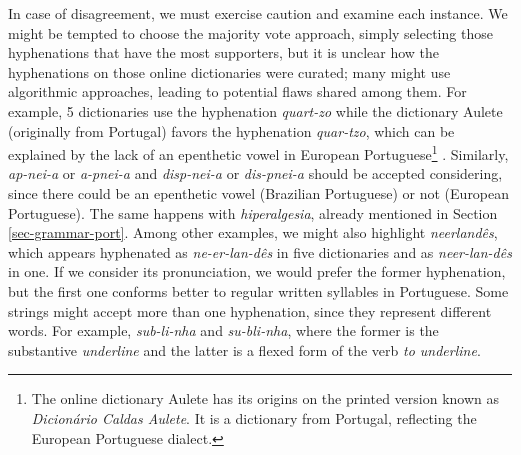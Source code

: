In case of disagreement, we must exercise caution and examine each instance.
We might be tempted to choose the majority vote approach, simply selecting
those hyphenations that have the most supporters, but it is unclear 
how the hyphenations on those online dictionaries were curated; 
many might use algorithmic approaches, leading to potential flaws shared
among them. 
For example, 5 dictionaries use the hyphenation 
\emph{quart-zo} while the dictionary Aulete (originally from Portugal) favors the hyphenation \emph{quar-tzo},
which can be explained by the lack of an epenthetic vowel in European Portuguese\footnote{
The online dictionary Aulete has its origins on the printed version known as \emph{Dicionário Caldas Aulete}.
It is a dictionary from Portugal, reflecting the European Portuguese dialect.} \parencite{mateus}.
Similarly, \emph{ap-nei-a} or \emph{a-pnei-a} and \emph{disp-nei-a} or \emph{dis-pnei-a} should
be accepted considering, since there could be an epenthetic vowel (Brazilian Portuguese) or not (European Portuguese).
The same happens with \emph{hiperalgesia}, already mentioned in Section \ref{sec-grammar-port}.
Among other examples, we might also highlight \emph{neerlandês}, which appears 
hyphenated as \emph{ne-er-lan-dês} in five dictionaries and as \emph{neer-lan-dês} in one.
If we consider its pronunciation, we would prefer the former hyphenation, but the
first one conforms better to regular written syllables in Portuguese.
Some strings might accept more than one hyphenation, since they represent different words. For example, 
\emph{sub-li-nha} and \emph{su-bli-nha}, where the former is the substantive \emph{underline} and the latter is a flexed form of the verb \emph{to underline}.

